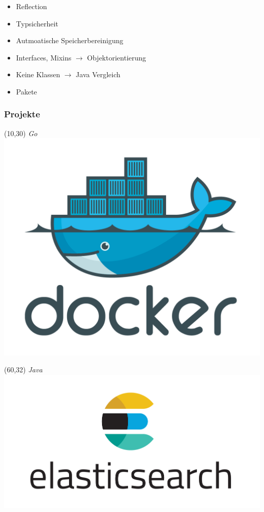 \documentclass{beamer}
\begin{document}
\begin{frame}

\begin{itemize}
\setlength{\itemsep}{16pt}
\item Reflection
\item Typsicherheit
\item Autmoatische Speicherbereinigung
\item Interfaces, Mixins $\rightarrow$ Objektorientierung
\item Keine Klassen $\rightarrow$ Java Vergleich
\item Pakete
\end{itemize}

\end{frame}

\begin{frame}

\frametitle{Projekte}

\begin{textblock}{20}(10,30)
\textit{Go}
\includegraphics[scale=0.22]{docker.png}
\end{textblock}

\begin{textblock}{20}(60,32)
\textit{Java}
\includegraphics[scale=0.22]{elasticsearch.png}
\end{textblock}

\end{frame}
\end{document}
